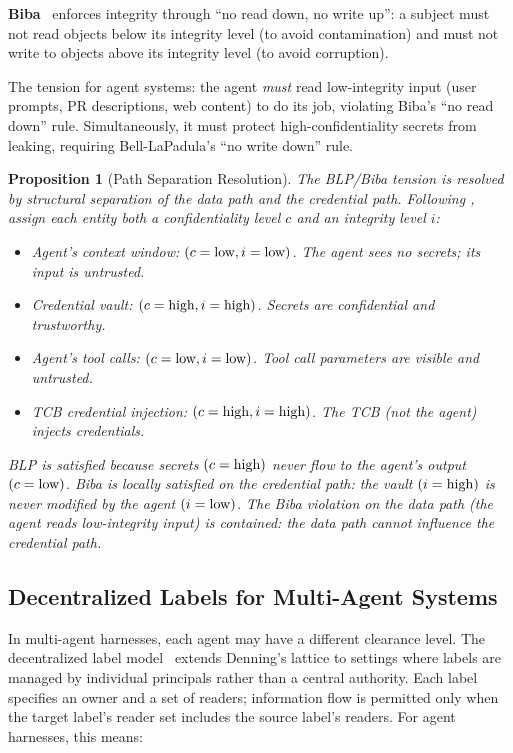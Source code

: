 \documentclass[11pt, a4paper, copyright]{googledeepmind}
\newtheorem{proposition}{Proposition}[section]
\begin{document}
\textbf{Biba}~\citep{biba1977integrity} enforces integrity through ``no read down, no write up'': a subject must not read objects below its integrity level (to avoid contamination) and must not write to objects above its integrity level (to avoid corruption).

The tension for agent systems: the agent \emph{must} read low-integrity input (user prompts, PR descriptions, web content) to do its job, violating Biba's ``no read down'' rule. Simultaneously, it must protect high-confidentiality secrets from leaking, requiring Bell-LaPadula's ``no write down'' rule.

\begin{proposition}[Path Separation Resolution]
\label{prop:path-separation}
The BLP/Biba tension is resolved by structural separation of the data path and the credential path. Following \citet{lipner1982nondiscretionary}, assign each entity both a confidentiality level $c$ and an integrity level $i$:
\begin{itemize}
    \item Agent's context window: $(c = \textup{low}, i = \textup{low})$. The agent sees no secrets; its input is untrusted.
    \item Credential vault: $(c = \textup{high}, i = \textup{high})$. Secrets are confidential and trustworthy.
    \item Agent's tool calls: $(c = \textup{low}, i = \textup{low})$. Tool call parameters are visible and untrusted.
    \item TCB credential injection: $(c = \textup{high}, i = \textup{high})$. The TCB (not the agent) injects credentials.
\end{itemize}
BLP is satisfied because secrets $(c = \textup{high})$ never flow to the agent's output $(c = \textup{low})$. Biba is locally satisfied on the credential path: the vault $(i = \textup{high})$ is never modified by the agent $(i = \textup{low})$. The Biba violation on the data path (the agent reads low-integrity input) is contained: the data path cannot influence the credential path.
\end{proposition}

\subsection{Decentralized Labels for Multi-Agent Systems}

In multi-agent harnesses, each agent may have a different clearance level. The decentralized label model~\citep{myers1997decentralized} extends Denning's lattice to settings where labels are managed by individual principals rather than a central authority. Each label specifies an owner and a set of readers; information flow is permitted only when the target label's reader set includes the source label's readers. For agent harnesses, this means:
\end{document}
